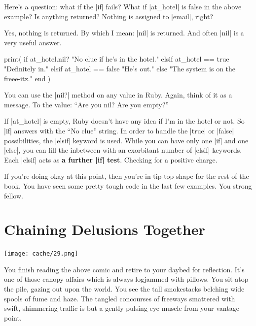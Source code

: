 \documentclass[12pt,twoside]{report}
\begin{document}
Here's a question: what if the \rubyinline|if| fails?
What if \rubyinline|at_hotel| is false in the above
example? Is anything returned?  Nothing is assigned to
\rubyinline|email|, right?

Yes, nothing is returned.  By which I mean:
\rubyinline|nil| is returned.  And often
\rubyinline|nil| is a very useful answer.


\begin{rubycode}

 print( if at_hotel.nil?
          "No clue if he's in the hotel."
        elsif at_hotel == true
          "Definitely in."
        elsif at_hotel == false
          "He's out."
        else
          "The system is on the freee-itz."
        end )

\end{rubycode}


You can use the \rubyinline|nil?| method on any value
in Ruby.  Again, think of it as a message. To the value: ``Are you
nil?  Are you empty?''

If \rubyinline|at_hotel| is empty, Ruby doesn't have
any idea if I'm in the hotel or not.  So
\rubyinline|if| answers with the ``No clue'' string.
In order to handle the \rubyinline|true| or
\rubyinline|false| possibilities, the
\rubyinline|elsif| keyword is used.  While you can
have only one \rubyinline|if| and one
\rubyinline|else|, you can fill the inbetween with an
exorbitant number of \rubyinline|elsif| keywords.
Each \rubyinline|elsif| acts as {\bf a further
  \rubyinline|if| test}.  Checking for a positive
charge.

If you're doing okay at this point, then you're in tip-top shape for
the rest of the book.  You have seen some pretty tough code in the
last few examples.  You strong fellow.


\section{Chaining Delusions Together}


	\texttt{[image: cache/29.png]}

You finish reading the above comic and retire to your daybed for
reflection. It's one of those canopy affairs which is always logjammed
with pillows.  You sit atop the pile, gazing out upon the world.  You
see the tall smokestacks belching wide spools of fume and haze.  The
tangled concourses of freeways smattered with swift, shimmering
traffic is but a gently pulsing eye muscle from your vantage point.
\end{document}
